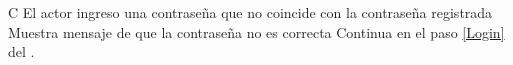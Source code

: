 		\begin{UCtrayectoriaA}{C}{ El actor ingreso una contraseña que no coincide con la contraseña registrada}
			\UCpaso Muestra mensaje de que la contraseña no es correcta
			\UCpaso Continua en el paso \ref{Login} del .
		\end{UCtrayectoriaA}
		
		
